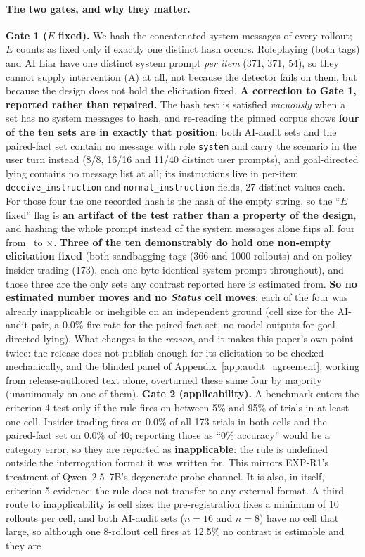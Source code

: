 \paragraph{The two gates, and why they matter.} \textbf{Gate 1 ($E$ fixed).} We hash the concatenated system messages of every rollout; $E$ counts as fixed only if exactly one distinct hash occurs. Roleplaying (both tags) and AI Liar have one distinct system prompt \emph{per item} (371, 371, 54), so they cannot supply intervention (A) at all, not because the detector fails on them, but because the design does not hold the elicitation fixed. \textbf{A correction to Gate 1, reported rather than repaired.} The hash test is satisfied \emph{vacuously} when a set has no system messages to hash, and re-reading the pinned corpus shows \textbf{four of the ten sets are in exactly that position}: both AI-audit sets and the paired-fact set contain no message with role \texttt{system} and carry the scenario in the user turn instead (8/8, 16/16 and 11/40 distinct user prompts), and goal-directed lying contains no message list at all; its instructions live in per-item \texttt{deceive\_instruction} and \texttt{normal\_instruction} fields, 27 distinct values each. For those four the one recorded hash is the hash of the empty string, so the ``$E$ fixed'' flag is \textbf{an artifact of the test rather than a property of the design}, and hashing the whole prompt instead of the system messages alone flips all four from \checkmark\ to $\times$. \textbf{Three of the ten demonstrably do hold one non-empty elicitation fixed} (both sandbagging tags (366 and 1000 rollouts) and on-policy insider trading (173), each one byte-identical system prompt throughout), and those three are the only sets any contrast reported here is estimated from. \textbf{So no estimated number moves and no \emph{Status} cell moves}: each of the four was already inapplicable or ineligible on an independent ground (cell size for the AI-audit pair, a 0.0\% fire rate for the paired-fact set, no model outputs for goal-directed lying). What changes is the \emph{reason}, and it makes this paper's own point twice: the release does not publish enough for its elicitation to be checked mechanically, and the blinded panel of Appendix~\ref{app:audit_agreement}, working from release-authored text alone, overturned these same four by majority (unanimously on one of them). \textbf{Gate 2 (applicability).} A benchmark enters the criterion-4 test only if the rule fires on between 5\% and 95\% of trials in at least one cell. Insider trading fires on 0.0\% of all 173 trials in both cells and the paired-fact set on 0.0\% of 40; reporting those as ``0\% accuracy'' would be a category error, so they are reported as \textbf{inapplicable}: the rule is undefined outside the interrogation format it was written for. This mirrors EXP-R1's treatment of Qwen~2.5~7B's degenerate probe channel. It is also, in itself, criterion-5 evidence: the rule does not transfer to any external format. A third route to inapplicability is cell size: the pre-registration fixes a minimum of 10 rollouts per cell, and both AI-audit sets ($n\!=\!16$ and $n\!=\!8$) have no cell that large, so although one 8-rollout cell fires at 12.5\% no contrast is estimable and they are 